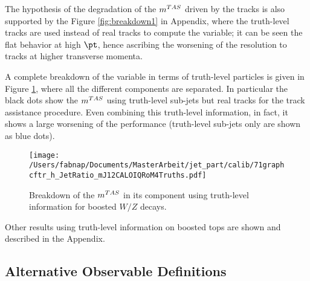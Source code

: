 The hypothesis of the degradation of the $\mtas$ driven by the tracks is also supported by the Figure \ref{fig:breakdown1} in Appendix, where the truth-level tracks are used instead of real tracks to compute the variable; it can be seen the flat behavior at high $\pt$, hence ascribing the worsening of the resolution to tracks at higher transverse momenta.


A complete breakdown of the variable in terms of truth-level particles is given in Figure \ref{fig:breakdown2}, where all the different components are separated.
In particular the black dots show the $\mtas$ using truth-level sub-jets but real tracks for the track assistance procedure.
Even combining this truth-level information, in fact, it shows a large worsening of the performance (truth-level sub-jets only are shown as blue dots).


\begin{figure}[!ht]
  \centering
      \texttt{[image: /Users/fabnap/Documents/MasterArbeit/jet\_part/calib/71graphcftr\_h\_JetRatio\_mJ12CALOIQRoM4Truths.pdf]}
  \caption[Breakdown of the $\mtas$ ]{Breakdown of the $\mtas$ in its component using truth-level information for boosted $W/Z$ decays.}
  \label{fig:breakdown2}
\end{figure}

Other results using truth-level information on boosted tops are shown and described in the Appendix.


% 


\subsection{Alternative Observable Definitions}
\label{sec:alternate}

